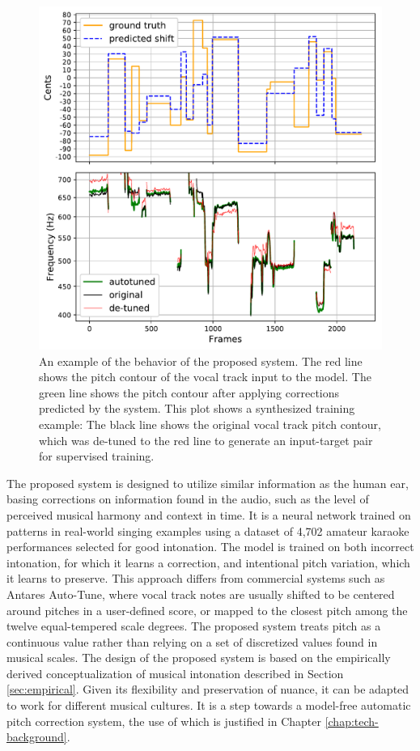 \begin{figure}[t]
    \centering
    \includegraphics[width=\columnwidth]{figures/results.pdf}
    \caption{An example of the behavior of the proposed system. The red line shows the pitch contour of the vocal track input to the model. The green line shows the pitch contour after applying corrections predicted by the system. This plot shows a synthesized training example: The black line shows the original vocal track pitch contour, which was de-tuned to the red line to generate an input-target pair for supervised training.}
    \label{fig:results}
\end{figure}

The proposed system is designed to utilize similar information as the human ear, basing corrections on information found in the audio, such as the level of perceived musical harmony and context in time. It is a neural network trained on patterns in real-world singing examples using a dataset of 4,702 amateur karaoke performances selected for good intonation. The model is trained on both incorrect intonation, for which it learns a correction, and intentional pitch variation, which it learns to preserve. This approach differs from commercial systems such as Antares Auto-Tune, where vocal track notes are usually shifted to be centered around pitches in a user-defined score, or mapped to the closest pitch among the twelve equal-tempered scale degrees. The proposed system treats pitch as a continuous value rather than relying on a set of discretized values found in musical scales. The design of the proposed system is based on the empirically derived conceptualization of musical intonation described in Section \ref{sec:empirical}. Given its flexibility and preservation of nuance, it can be adapted to work for different musical cultures. It is a step towards a model-free automatic pitch correction system, the use of which is justified in Chapter \ref{chap:tech-background}. 

